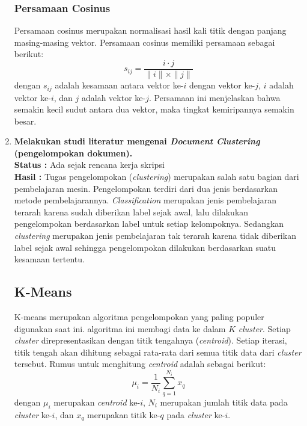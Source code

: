\documentclass[a4paper,twoside]{article}
\begin{document}
\begin{enumerate}
\subsubsection*{Persamaan Cosinus}
\label{sub:cosineDist}
Persamaan cosinus merupakan normalisasi hasil kali titik dengan panjang masing-masing vektor. Persamaan cosinus memiliki persamaan sebagai berikut:
\begin{equation}
s_{ij}=\frac{i\cdot j}{\parallel i \parallel \times \parallel j \parallel}
\end{equation}
dengan $s_{ij}$ adalah kesamaan antara vektor ke-$i$ dengan vektor ke-$j$, $i$ adalah vektor ke-$i$, dan $j$ adalah vektor ke-$j$. Persamaan ini menjelaskan bahwa semakin kecil sudut antara dua vektor, maka tingkat kemiripannya semakin besar.
		
		\item \textbf{Melakukan studi literatur mengenai {\it Document Clustering} (pengelompokan dokumen).}\\
		{\bf Status :} Ada sejak rencana kerja skripsi\\
		{\bf Hasil :} Tugas pengelompokan (\textit{clustering}) merupakan salah satu bagian dari pembelajaran mesin. Pengelompokan terdiri dari dua jenis berdasarkan metode pembelajarannya. \textit{Classification} merupakan jenis pembelajaran terarah karena sudah diberikan label sejak awal, lalu dilakukan pengelompokan berdasarkan label untuk setiap kelompoknya. Sedangkan \textit{clustering} merupakan jenis pembelajaran tak terarah karena tidak diberikan label sejak awal sehingga pengelompokan dilakukan berdasarkan suatu kesamaan tertentu.

\subsection*{K-Means}
K-means merupakan algoritma pengelompokan yang paling populer digunakan saat ini. algoritma ini membagi data ke dalam $K$ \textit{cluster}. Setiap \textit{cluster} direpresentasikan dengan titik tengahnya (\textit{centroid}). Setiap iterasi, titik tengah akan dihitung sebagai rata-rata dari semua titik data dari \textit{cluster} tersebut. Rumus untuk menghitung \textit{centroid} adalah sebagai berikut:
\begin{equation}
\label{eq:kmeans}
\mu_i=\frac{1}{N_i}\sum_{q=1}^{N_i}x_q
\end{equation}
dengan $\mu_i$ merupakan \textit{centroid} ke-$i$, $N_i$ merupakan jumlah titik data pada \textit{cluster} ke-$i$, dan $x_q$ merupakan titik ke-$q$ pada \textit{cluster} ke-$i$.


\end{enumerate}
\end{document}
